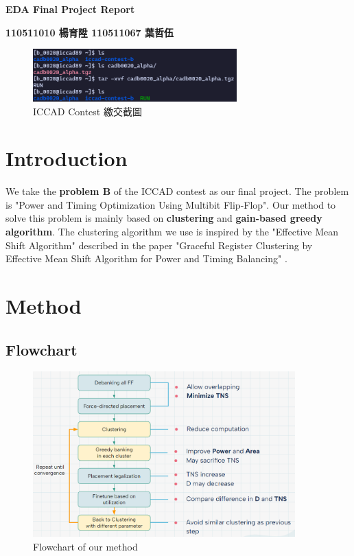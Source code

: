 \documentclass[12pt]{article}
\begin{document}
\begin{center}
    \huge \textbf{EDA Final Project Report}
    
    \vspace{10pt}
    
    \large \textbf{110511010 楊育陞 110511067 葉哲伍}
\end{center}

\begin{figure}[ht]
    \centering
    \includegraphics[width=0.7\textwidth]{handin.png}
    \caption*{ICCAD Contest 繳交截圖}
\end{figure}

\section{Introduction}

\indent We take the \textbf{problem B} of the ICCAD contest as our final project. The problem is "Power and Timing Optimization Using Multibit Flip-Flop". Our method to solve this problem is mainly based on \textbf{clustering} and \textbf{gain-based greedy algorithm}. The clustering algorithm we use is inspired by the "Effective Mean Shift Algorithm" described in the paper "Graceful Register Clustering by Effective Mean Shift Algorithm for Power and Timing Balancing" \cite{jiang}.

\section{Method}

\subsection{Flowchart}

\begin{figure}[htbp]
    \centering
    \includegraphics[width=0.9\textwidth]{flowchart2.png}
    \caption{Flowchart of our method}
    \label{fig:flowchart}
\end{figure}
\FloatBarrier
\end{document}
